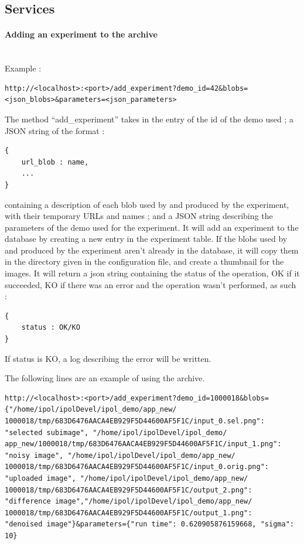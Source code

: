 \subsection{Services}

\paragraph{Adding an experiment to the archive} \hspace{0pt} \\
Example :
\begin{verbatim}
http://<localhost>:<port>/add_experiment?demo_id=42&blobs=
<json_blobs>&parameters=<json_parameters>
\end{verbatim}
The method ``add\_experiment'' takes in the entry of the id of the demo used ; a JSON string of the format : 
\begin{verbatim}
{
    url_blob : name,
    ...
}
\end{verbatim}

containing a description of each blob used by and produced by the experiment, with their temporary URLs and names ; and a JSON string describing the parameters of the demo used for the experiment. It will add an experiment to the database by creating a new entry in the experiment table. If the blobs used by and produced by the experiment aren't already in the database, it will copy them in the directory given in the configuration file, and create a thumbnail for the images. It will return a json string containing the status of the operation, OK if it succeeded, KO if there was an error and the operation wasn't performed, as such :

\begin{verbatim}
{
    status : OK/KO
}
\end{verbatim}

If status is KO, a log describing the error will be written.

The following lines are an example of using the archive. 
\begin{verbatim}
http://<localhost>:<port>/add_experiment?demo_id=1000018&blobs=
{"/home/ipol/ipolDevel/ipol_demo/app_new/
1000018/tmp/683D6476AACA4EB929F5D44600AF5F1C/input_0.sel.png": 
"selected subimage", "/home/ipol/ipolDevel/ipol_demo/
app_new/1000018/tmp/683D6476AACA4EB929F5D44600AF5F1C/input_1.png":
"noisy image", "/home/ipol/ipolDevel/ipol_demo/app_new/
1000018/tmp/683D6476AACA4EB929F5D44600AF5F1C/input_0.orig.png": 
"uploaded image", "/home/ipol/ipolDevel/ipol_demo/app_new/
1000018/tmp/683D6476AACA4EB929F5D44600AF5F1C/output_2.png": 
"difference image","/home/ipol/ipolDevel/ipol_demo/app_new/
1000018/tmp/683D6476AACA4EB929F5D44600AF5F1C/output_1.png":
"denoised image"}&parameters={"run time": 0.620905876159668, "sigma": 10}
\end{verbatim}

